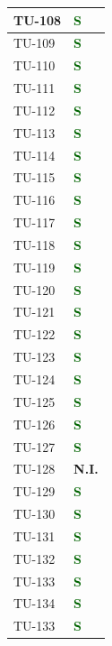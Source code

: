 \begin{longtable}{|C{2.5cm}|C{2.5cm}|}
	\hline
	{TU-108} & \textcolor{darkgreen}{\textbf{S}}\\
	\hline
	{TU-109} & \textcolor{darkgreen}{\textbf{S}}\\
	\hline
	{TU-110} & \textcolor{darkgreen}{\textbf{S}}\\
	\hline
	{TU-111} & \textcolor{darkgreen}{\textbf{S}}\\
	\hline
	{TU-112} & \textcolor{darkgreen}{\textbf{S}}\\
	\hline
	{TU-113} & \textcolor{darkgreen}{\textbf{S}}\\
	\hline
	{TU-114} & \textcolor{darkgreen}{\textbf{S}}\\
	\hline
	{TU-115} & \textcolor{darkgreen}{\textbf{S}}\\
	\hline
	{TU-116} & \textcolor{darkgreen}{\textbf{S}}\\
	\hline
	{TU-117} & \textcolor{darkgreen}{\textbf{S}}\\
	\hline
	{TU-118} & \textcolor{darkgreen}{\textbf{S}}\\
	\hline
	{TU-119} & \textcolor{darkgreen}{\textbf{S}}\\
	\hline
	{TU-120} & \textcolor{darkgreen}{\textbf{S}}\\
	\hline
	{TU-121} & \textcolor{darkgreen}{\textbf{S}}\\
	\hline
	{TU-122} & \textcolor{darkgreen}{\textbf{S}}\\
	\hline
	{TU-123} & \textcolor{darkgreen}{\textbf{S}}\\
	\hline
	{TU-124} & \textcolor{darkgreen}{\textbf{S}}\\
	\hline
	{TU-125} & \textcolor{darkgreen}{\textbf{S}}\\
	\hline
	{TU-126} & \textcolor{darkgreen}{\textbf{S}}\\
	\hline
	{TU-127} & \textcolor{darkgreen}{\textbf{S}}\\
	\hline
	{TU-128} & {\textbf{N.I.}}\\
	\hline
	{TU-129} & \textcolor{darkgreen}{\textbf{S}}\\
	\hline
	{TU-130} & \textcolor{darkgreen}{\textbf{S}}\\
	\hline
	{TU-131} & \textcolor{darkgreen}{\textbf{S}}\\
	\hline
	{TU-132} & \textcolor{darkgreen}{\textbf{S}}\\
	\hline
	{TU-133} & \textcolor{darkgreen}{\textbf{S}}\\
	\hline
	{TU-134} & \textcolor{darkgreen}{\textbf{S}}\\
	\hline
	{TU-133} & \textcolor{darkgreen}{\textbf{S}}\\

\end{longtable}
